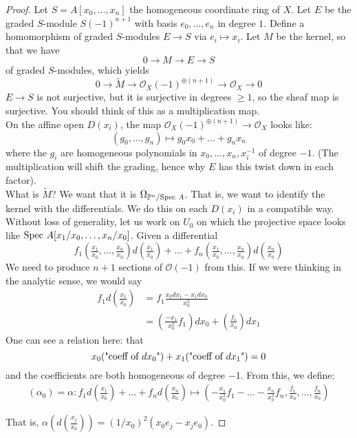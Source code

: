 \documentclass[10pt,reqno]{amsart}
\theoremstyle{definition}
\theoremstyle{remark}
\numberwithin{equation}{section}
\numberwithin{theorem}{section}
\newcommand{\OO}{{\mathcal O}}
\newcommand{\spec}{\textup{Spec }}
\newcommand{\wt}{\widetilde}
\newcommand{\PP}{{\mathbb P}}
\begin{document}
\begin{proof}
Let $S = A[x_0,\dots,x_n]$ the homogeneous coordinate ring of $X$. Let $E$ be the graded $S$-module $S(-1)^{n+1}$ with basis $e_0,\dots,e_n$ in degree $1$. Define a homomorphism of graded $S$-modules $E \to S$ via $e_i \mapsto x_i$. Let $M$ be the kernel, so that we have
\[0 \to M \to E \to S \]
of graded $S$-modules, which yields
\[0 \to \widetilde{M} \to \OO_X(-1)^{\oplus (n+1)} \to \OO_X \to 0\]
$E \to S$ is not surjective, but it is surjective in degrees $\ge 1$, so the sheaf map is surjective. You should think of this as a multiplication map.
\\

On the affine open $D(x_i)$, the map $\OO_X(-1)^{\oplus (n+1)} \to \OO_X$ looks like:
\[(g_0,\dots,g_n) \mapsto g_0 x_0 + \dots + g_n x_n\]
where the $g_i$ are homogeneous polynomials in $x_0,\dots,x_n,x_i^{-1}$ of degree $-1$. (The multiplication will shift the grading, hence why $E$ has this twist down in each factor).
\\

What is $\wt{M}$? We want that it is $\Omega_{\PP^n/\spec A}$. That is, we want to identify the kernel with the differentials. We do this on each $D(x_i)$ in a compatible way. Without loss of generality, let us work on $U_0$ on which the projective space looks like $\spec A[x_1/x_0,\dots,x_n/x_0]$. Given a differential
\[f_1(\tfrac{x_1}{x_0},\dots,\tfrac{x_n}{x_0})d(\tfrac{x_1}{x_0}) + \dots + f_n(\tfrac{x_1}{x_0},\dots,\tfrac{x_n}{x_0})d(\tfrac{x_n}{x_0})\]
We need to produce $n+1$ sections of $\OO(-1)$ from this. If we were thinking in the analytic sense, we would say
\begin{align*}
f_1 d\left(\frac{x_1}{x_0}\right) &= f_1 \frac{x_0 dx_1 - x_1 dx_0}{x_0^2} \tag{quotient rule}\\
&= \left(\frac{-x_1}{x_0^2}f_1\right) dx_0 + \left(\frac{f_1}{x_0}\right) dx_1
\end{align*}
One can see a relation here: that 
\[x_0(\textup{"coeff of $dx_0$"}) + x_1(\textup{"coeff of $dx_1$"}) = 0\]
and the coefficients are both homogeneous of degree $-1$. From this, we define:
\begin{align*}
(\alpha_0) = \alpha: f_1 d(\tfrac{x_1}{x_0}) + \dots + f_n d(\tfrac{x_n}{x_0}) \mapsto \left(-\frac{x_1}{x_0^2}f_1 - \dots - \frac{x_n}{x_0^2} f_n, \frac{f_1}{x_0},\dots, \frac{f_n}{x_0} \right)
\end{align*}

That is, $\alpha(d(\tfrac{x_j}{x_0})) = (1/x_0)^2(x_0 e_j - x_j e_0)$.


\end{proof}
\end{document}
